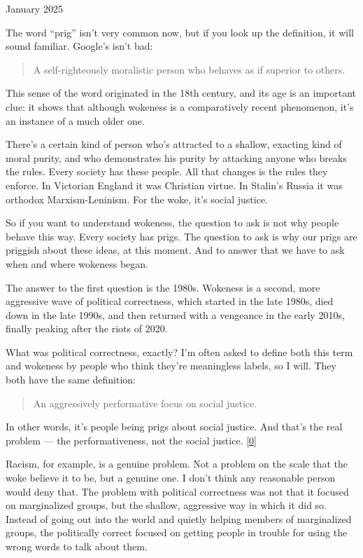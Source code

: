 January 2025

The word ``prig'' isn't very common now, but if you look up the
definition, it will sound familiar. Google's isn't bad:

\begin{quote}
A self-righteously moralistic person who behaves as if superior to
others.
\end{quote}

This sense of the word originated in the 18th century, and its age is an
important clue: it shows that although wokeness is a comparatively
recent phenomenon, it's an instance of a much older one.

There's a certain kind of person who's attracted to a shallow, exacting
kind of moral purity, and who demonstrates his purity by attacking
anyone who breaks the rules. Every society has these people. All that
changes is the rules they enforce. In Victorian England it was Christian
virtue. In Stalin's Russia it was orthodox Marxism-Leninism. For the
woke, it's social justice.

So if you want to understand wokeness, the question to ask is not why
people behave this way. Every society has prigs. The question to ask is
why our prigs are priggish about these ideas, at this moment. And to
answer that we have to ask when and where wokeness began.

The answer to the first question is the 1980s. Wokeness is a second,
more aggressive wave of political correctness, which started in the late
1980s, died down in the late 1990s, and then returned with a vengeance
in the early 2010s, finally peaking after the riots of 2020.

What was political correctness, exactly? I'm often asked to define both
this term and wokeness by people who think they're meaningless labels,
so I will. They both have the same definition:

\begin{quote}
An aggressively performative focus on social justice.
\end{quote}

In other words, it's people being prigs about social justice. And that's
the real problem --- the performativeness, not the social justice.
{[}\hyperref[f0n]{0}{]}

Racism, for example, is a genuine problem. Not a problem on the scale
that the woke believe it to be, but a genuine one. I don't think any
reasonable person would deny that. The problem with political
correctness was not that it focused on marginalized groups, but the
shallow, aggressive way in which it did so. Instead of going out into
the world and quietly helping members of marginalized groups, the
politically correct focused on getting people in trouble for using the
wrong words to talk about them.

